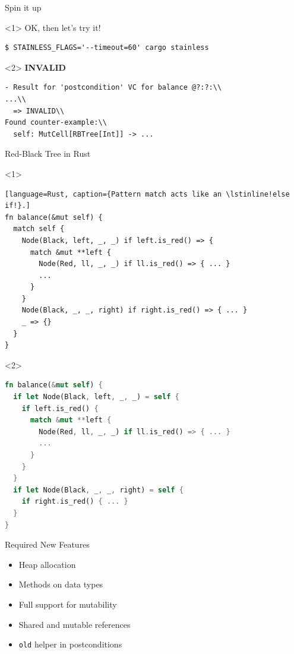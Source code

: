 \begin{frame}[fragile]{Spin it up}
\begin{onlyenv}<1>
OK, then let's try it! \\
\begin{lstlisting}[style=short]
$ STAINLESS_FLAGS='--timeout=60' cargo stainless
\end{lstlisting}
\end{onlyenv}

\begin{onlyenv}<2>
\textbf{\alert{INVALID}}
\begin{lstlisting}[style=short]
- Result for 'postcondition' VC for balance @?:?:\\
...\\
  => INVALID\\
Found counter-example:\\
  self: MutCell[RBTree[Int]] -> ...
\end{lstlisting}
\end{onlyenv}
\end{frame}

\begin{frame}[fragile]{Red-Black Tree in Rust}
\begin{onlyenv}<1>
\begin{lstlisting}[language=Rust, caption={Pattern match acts like an \lstinline!else if!}.]
fn balance(&mut self) {
  match self {
    Node(Black, left, _, _) if left.is_red() => {
      match &mut **left {
        Node(Red, ll, _, _) if ll.is_red() => { ... }
        ...
      }
    }
    Node(Black, _, _, right) if right.is_red() => { ... }
    _ => {}
  }
}
\end{lstlisting}
\end{onlyenv}
\begin{onlyenv}<2>
\begin{lstlisting}[language=Rust, caption={Solved bug in balance function.}]
fn balance(&mut self) {
  if let Node(Black, left, _, _) = self {
    if left.is_red() {
      match &mut **left {
        Node(Red, ll, _, _) if ll.is_red() => { ... }
        ...
      }
    }
  }
  if let Node(Black, _, _, right) = self {
    if right.is_red() { ... }
  }
}
\end{lstlisting}
\end{onlyenv}
\end{frame}

\begin{frame}{Required New Features}
\begin{itemize}
\item Heap allocation
\item Methods on data types
\item Full support for mutability
\item Shared and mutable references
\item \lstinline!old! helper in postconditions
\end{itemize}
\end{frame}

